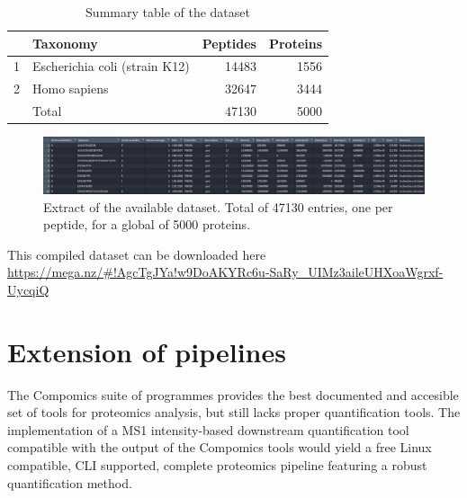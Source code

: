 \documentclass[11pt, a4paper]{report}
\begin{document}
\begin{table}[ht]
\centering
\begin{tabular}{rlrr}
  \hline
 & Taxonomy & Peptides & Proteins \\ 
  \hline
1 & Escherichia coli (strain K12) & 14483 & 1556 \\ 
  2 & Homo sapiens & 32647 & 3444 \\ 
   \hline
   & Total & 47130 & 5000
\end{tabular}
\caption{Summary table of the dataset}
\label{table:summary_peptide_data}
\end{table}

\begin{figure}[!h]
\includegraphics[width=1\textwidth]{dataset}
\caption{Extract of the available dataset. Total of 47130 entries, one per peptide, for a global of 5000 proteins.}
\label{fig:screenshot_peptide_data}
\end{figure}

This compiled dataset can be downloaded here \href{https://mega.nz/\#!AgcTgJYa!w9DoAKYRc6u-SaRy\_UIMz3aileUHXoaWgrxf-UycqiQ}{https://mega.nz/\#!AgcTgJYa!w9DoAKYRc6u-SaRy\_UIMz3aileUHXoaWgrxf-UycqiQ}

\section{Extension of pipelines}

The Compomics suite of programmes provides the best documented and accesible set of tools for proteomics analysis, but still lacks proper quantification tools. The implementation of a MS1 intensity-based downstream quantification tool compatible with the output of the Compomics tools would yield a free Linux compatible, CLI supported, complete proteomics pipeline featuring a robust quantification method.


\footnotesize{}
\end{document}
